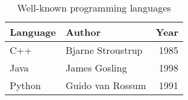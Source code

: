 \begin{table}[h]
    \centering
    \begin{tabular}{llr}
        \toprule
        Language & Author           & Year \\
        \midrule
        C++      & Bjarne Stroustrup& 1985 \\
        Java     & James Gosling    & 1998 \\
        Python   & Guido van Rossum & 1991 \\
        \bottomrule
    \end{tabular}
    \caption{Well-known programming languages}
\end{table}

